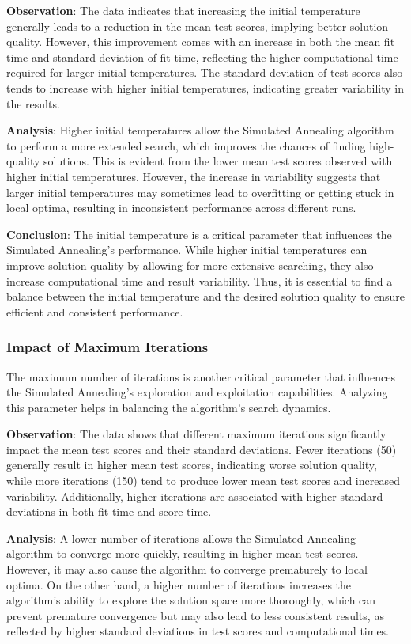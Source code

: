\documentclass{article}
\begin{document}
    \textbf{Observation}: The data indicates that increasing the initial temperature generally leads to a reduction in the mean test scores, implying better solution quality. However, this improvement comes with an increase in both the mean fit time and standard deviation of fit time, reflecting the higher computational time required for larger initial temperatures. The standard deviation of test scores also tends to increase with higher initial temperatures, indicating greater variability in the results.

    \textbf{Analysis}: Higher initial temperatures allow the Simulated Annealing algorithm to perform a more extended search, which improves the chances of finding high-quality solutions. This is evident from the lower mean test scores observed with higher initial temperatures. However, the increase in variability suggests that larger initial temperatures may sometimes lead to overfitting or getting stuck in local optima, resulting in inconsistent performance across different runs.

    \textbf{Conclusion}: The initial temperature is a critical parameter that influences the Simulated Annealing's performance. While higher initial temperatures can improve solution quality by allowing for more extensive searching, they also increase computational time and result variability. Thus, it is essential to find a balance between the initial temperature and the desired solution quality to ensure efficient and consistent performance.

    \subsubsection{Impact of Maximum Iterations}

    The maximum number of iterations is another critical parameter that influences the Simulated Annealing’s exploration and exploitation capabilities. Analyzing this parameter helps in balancing the algorithm’s search dynamics.

    \textbf{Observation}: The data shows that different maximum iterations significantly impact the mean test scores and their standard deviations. Fewer iterations (50) generally result in higher mean test scores, indicating worse solution quality, while more iterations (150) tend to produce lower mean test scores and increased variability. Additionally, higher iterations are associated with higher standard deviations in both fit time and score time.

    \textbf{Analysis}: A lower number of iterations allows the Simulated Annealing algorithm to converge more quickly, resulting in higher mean test scores. However, it may also cause the algorithm to converge prematurely to local optima. On the other hand, a higher number of iterations increases the algorithm's ability to explore the solution space more thoroughly, which can prevent premature convergence but may also lead to less consistent results, as reflected by higher standard deviations in test scores and computational times.
\end{document}
